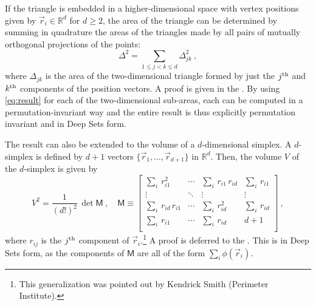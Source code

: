 \documentclass[10pt]{article}
\begin{document}

If the triangle is embedded in a higher-dimensional space with vertex positions given by $\vec{r}_i \in \mathbb{R}^{d}$ for $d \geq 2$, the area of the triangle can be determined by summing in quadrature the areas of the triangles made by all pairs of mutually orthogonal projections of the points:
\begin{equation}
    \Delta^2 = \sum_{1 \leq j < k \leq d} \Delta_{jk}^2~, 
    \label{eq:quadrature}
\end{equation}
where $\Delta_{jk}$ is the area of the two-dimensional triangle formed by just the $j^{\rm th}$ and $k^{\rm th}$ components of the position vectors.
A proof is given in the .
By using \eqref{eq:result} for each of the two-dimensional sub-areas, each can be computed in a permutation-invariant way and the entire result is thus explicitly permutation invariant and in Deep Sets form.

The result can also be extended to the volume of a $d$-dimensional simplex.
A $d$-simplex is defined by $d+1$ vectors $\{ \vec{r}_1, \dots, \vec{r}_{d+1} \}$ in $\mathbb{R}^d$.
Then, the volume $V$ of the $d$-simplex is given by
\begin{equation}
    V^2 = \frac{1}{(d!)^2} \, \det \mathsf{M}~,
    \quad
    \mathsf{M} \equiv \left[\begin{array}{cccc}
        \sum_i \, r_{i1}^2
            & \cdots 
            & \sum_i \, r_{i1} \, r_{id}
            & \sum_i \, r_{i1} \\
        \vdots
            & \ddots 
            & \vdots
            & \vdots \\
        \sum_i \, r_{id} \, r_{i1}
            & \cdots 
            & \sum_i \, r_{id}^2
            & \sum_i \, r_{id} \\
        \sum_i \, r_{i1}
            & \cdots 
            & \sum_i \, r_{id}
            & d + 1 \\
    \end{array}\right]~,
    \label{eq:dsimplex}
\end{equation}
where $r_{ij}$ is the $j^{\rm th}$ component of $\vec{r}_i$.\footnote{%
    This generalization was pointed out by Kendrick Smith (Perimeter Institute).}
A proof is deferred to the .
This is in Deep Sets form, as the components of $\mathsf{M}$ are all of the form $\sum_i \phi(\vec{r}_i)$.
\end{document}
